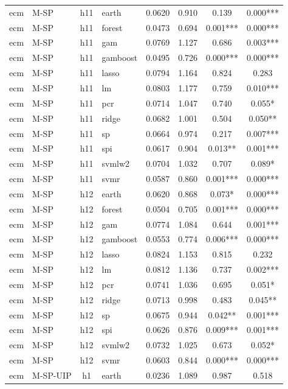 \begin{ThreePartTable}
\begin{longtable}[t]{llclcccc}
\addlinespace
ecm & M-SP & h11 & earth & 0.0620 & 0.910 & 0.139 & 0.000***\\
ecm & M-SP & h11 & forest & 0.0473 & 0.694 & 0.001*** & 0.000***\\
ecm & M-SP & h11 & gam & 0.0769 & 1.127 & 0.686 & 0.003***\\
ecm & M-SP & h11 & gamboost & 0.0495 & 0.726 & 0.000*** & 0.000***\\
ecm & M-SP & h11 & lasso & 0.0794 & 1.164 & 0.824 & 0.283\\
ecm & M-SP & h11 & lm & 0.0803 & 1.177 & 0.759 & 0.010***\\
ecm & M-SP & h11 & pcr & 0.0714 & 1.047 & 0.740 & 0.055*\\
ecm & M-SP & h11 & ridge & 0.0682 & 1.001 & 0.504 & 0.050**\\
ecm & M-SP & h11 & sp & 0.0664 & 0.974 & 0.217 & 0.007***\\
ecm & M-SP & h11 & spi & 0.0617 & 0.904 & 0.013** & 0.001***\\
ecm & M-SP & h11 & svmlw2 & 0.0704 & 1.032 & 0.707 & 0.089*\\
ecm & M-SP & h11 & svmr & 0.0587 & 0.860 & 0.001*** & 0.000***\\
\addlinespace
ecm & M-SP & h12 & earth & 0.0620 & 0.868 & 0.073* & 0.000***\\
ecm & M-SP & h12 & forest & 0.0504 & 0.705 & 0.001*** & 0.000***\\
ecm & M-SP & h12 & gam & 0.0774 & 1.084 & 0.644 & 0.001***\\
ecm & M-SP & h12 & gamboost & 0.0553 & 0.774 & 0.006*** & 0.000***\\
ecm & M-SP & h12 & lasso & 0.0824 & 1.153 & 0.815 & 0.232\\
ecm & M-SP & h12 & lm & 0.0812 & 1.136 & 0.737 & 0.002***\\
ecm & M-SP & h12 & pcr & 0.0741 & 1.036 & 0.695 & 0.051*\\
ecm & M-SP & h12 & ridge & 0.0713 & 0.998 & 0.483 & 0.045**\\
ecm & M-SP & h12 & sp & 0.0675 & 0.944 & 0.042** & 0.001***\\
ecm & M-SP & h12 & spi & 0.0626 & 0.876 & 0.009*** & 0.001***\\
ecm & M-SP & h12 & svmlw2 & 0.0732 & 1.025 & 0.673 & 0.052*\\
ecm & M-SP & h12 & svmr & 0.0603 & 0.844 & 0.000*** & 0.000***\\
\addlinespace
ecm & M-SP-UIP & h1 & earth & 0.0236 & 1.089 & 0.987 & 0.518\\

\end{longtable}
\end{ThreePartTable}
